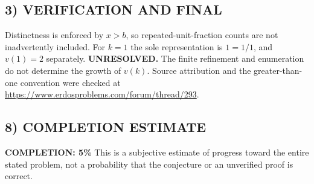 \subsection*{3) VERIFICATION AND FINAL}
Distinctness is enforced by $x>b$, so repeated-unit-fraction counts are
not inadvertently included. For $k=1$ the sole representation is $1=1/1$,
and $v(1)=2$ separately. \textbf{UNRESOLVED.} The finite refinement and
enumeration do not determine the growth of $v(k)$.
Source attribution and the greater-than-one convention were checked at
\url{https://www.erdosproblems.com/forum/thread/293}.

\subsection*{8) COMPLETION ESTIMATE}
\textbf{COMPLETION: 5\%}
This is a subjective estimate of progress toward the entire stated problem, not a probability that the conjecture or an unverified proof is correct.
